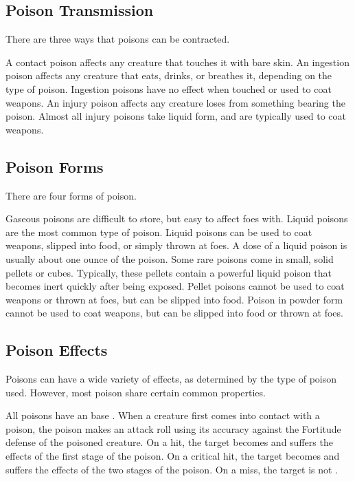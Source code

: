     \subsection{Poison Transmission}\label{Poison Transmission}\label{Transmission}

        There are three ways that poisons can be contracted.

         A contact poison affects any creature that touches it with bare skin.
         An ingestion poison affects any creature that eats, drinks, or breathes it, depending on the type of poison.
        Ingestion poisons have no effect when touched or used to coat weapons.
         An injury poison affects any creature loses  from something bearing the poison.
        Almost all injury poisons take liquid form, and are typically used to coat weapons.

    \subsection{Poison Forms}\label{Poison Forms}

        There are four forms of poison.

         Gaseous poisons are difficult to store, but easy to affect foes with.
         Liquid poisons are the most common type of poison.
        Liquid poisons can be used to coat weapons, slipped into food, or simply thrown at foes.
        A dose of a liquid poison is usually about one ounce of the poison.
         Some rare poisons come in small, solid pellets or cubes.
        Typically, these pellets contain a powerful liquid poison that becomes inert quickly after being exposed.
        Pellet poisons cannot be used to coat weapons or thrown at foes, but can be slipped into food.
         Poison in powder form cannot be used to coat weapons, but can be slipped into food or thrown at foes.

    \subsection{Poison Effects}\label{Poison Effects}

        Poisons can have a wide variety of effects, as determined by the type of poison used.
        However, most poison share certain common properties.

        All poisons have an base .
        When a creature first comes into contact with a poison, the poison makes an attack roll using its accuracy against the Fortitude defense of the poisoned creature.
        On a hit, the target becomes  and suffers the effects of the first stage of the poison.
        On a critical hit, the target becomes  and suffers the effects of the two stages of the poison.
        On a miss, the target is not .

